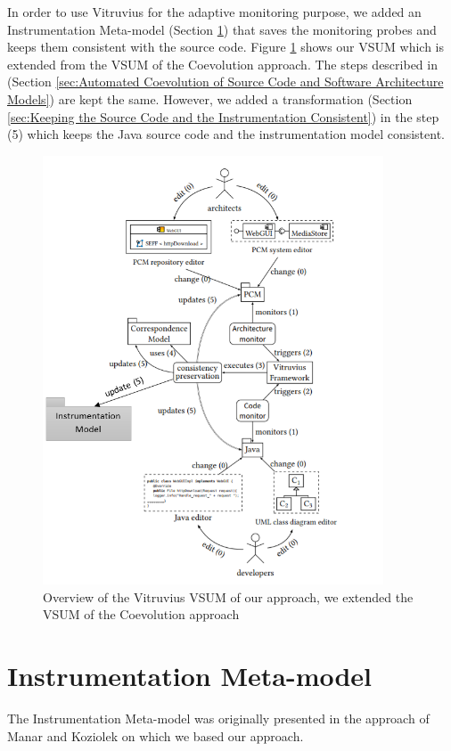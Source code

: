 In order to use Vitruvius for the adaptive monitoring purpose, we added an Instrumentation Meta-model (Section \ref{sec:Instrumentation Model}) that saves the monitoring probes and keeps them consistent with the source code. Figure \ref{fig:extended_vsum} shows our VSUM which is extended from the VSUM of the Coevolution approach. The steps described in (Section \ref{sec:Automated Coevolution of Source Code and Software Architecture Models}) are kept the same. However, we added a transformation (Section \ref{sec:Keeping the Source Code and the Instrumentation Consistent}) in the step (5) which keeps the Java source code and the instrumentation model consistent. 

\begin{figure}[h]
\centering
\includegraphics[width=0.9\textwidth]{figures/extended_vsum}
\caption{Overview of the Vitruvius VSUM of our approach, we extended the VSUM of the Coevolution approach}
\label{fig:extended_vsum}
\end{figure}

\section{Instrumentation Meta-model}
\label{sec:Instrumentation Model}
The Instrumentation Meta-model was originally presented in the approach of Manar and Koziolek \cite{mazkatli2018continuous} on which we based our approach. 

